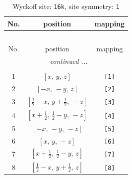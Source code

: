 \documentclass[fleqn,8pt]{jsarticle}
\begin{document}
\renewcommand{\arraystretch}{1.2}
\begin{longtable}{ccc}
\caption{Wyckoff site: {\tt 16k}, site symmetry: {\tt 1}}
 \\
 \hline \hline
No. & position & mapping \\ \hline \endfirsthead

\multicolumn{2}{l}{\tablename\ \thetable{}} \\
 \hline \hline
No. & position & mapping \\ \hline \endhead

 \hline \hline
\multicolumn{2}{r}{\footnotesize\it continued ...} \\ \endfoot

 \hline \hline
\multicolumn{2}{r}{} \\ \endlastfoot

1 & $\left[ x,\, y,\, z \right]$ & {\tt [1]} \\ \hline
2 & $\left[ - x,\, - y,\, z \right]$ & {\tt [2]} \\ \hline
3 & $\left[ \frac{1}{2} - x,\, y + \frac{1}{2},\, - z \right]$ & {\tt [3]} \\ \hline
4 & $\left[ x + \frac{1}{2},\, \frac{1}{2} - y,\, - z \right]$ & {\tt [4]} \\ \hline
5 & $\left[ - x,\, - y,\, - z \right]$ & {\tt [5]} \\ \hline
6 & $\left[ x,\, y,\, - z \right]$ & {\tt [6]} \\ \hline
7 & $\left[ x + \frac{1}{2},\, \frac{1}{2} - y,\, z \right]$ & {\tt [7]} \\ \hline
8 & $\left[ \frac{1}{2} - x,\, y + \frac{1}{2},\, z \right]$ & {\tt [8]} \\
\end{longtable}
\end{document}
